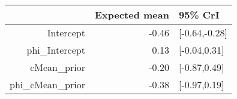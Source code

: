 \begin{tabular}{rrl}
  \hline
 & Expected mean & 95\% CrI \\ 
  \hline
Intercept & -0.46 & [-0.64,-0.28] \\ 
  phi\_Intercept & 0.13 & [-0.04,0.31] \\ 
  cMean\_prior & -0.20 & [-0.87,0.49] \\ 
  phi\_cMean\_prior & -0.38 & [-0.97,0.19] \\ 
   \hline
\end{tabular}

